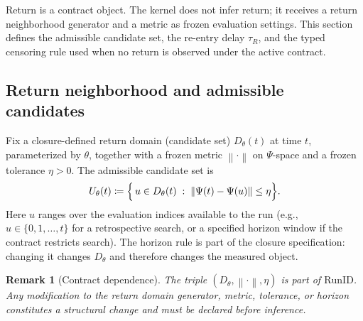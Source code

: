 \documentclass[
  aps,
  prd,
  preprint,
  superscriptaddress,
  nofootinbib,
  floatfix
]{revtex4-2}
\newcommand{\norm}[1]{\left\lVert #1 \right\rVert}
\newtheorem{remark}{Remark}
\begin{document}
Return is a contract object. The kernel does not infer return; it receives a return neighborhood generator and a metric
as frozen evaluation settings. This section defines the admissible candidate set, the re-entry delay $\tau_R$, and the
typed censoring rule used when no return is observed under the active contract.

\subsection{Return neighborhood and admissible candidates}
Fix a closure-defined return domain (candidate set) $D_\theta(t)$ at time $t$, parameterized by $\theta$, together with a
frozen metric $\norm{\cdot}$ on $\Psi$-space and a frozen tolerance $\eta>0$.
The admissible candidate set is
\begin{equation}
  U_\theta(t) \coloneqq \Bigl\{\,u\in D_\theta(t)\;:\; \norm{\Psi(t)-\Psi(u)}\le \eta \Bigr\}.
\end{equation}
Here $u$ ranges over the evaluation indices available to the run (e.g., $u\in\{0,1,\dots,t\}$ for a retrospective search,
or a specified horizon window if the contract restricts search). The horizon rule is part of the closure specification:
changing it changes $D_\theta$ and therefore changes the measured object.

\begin{remark}[Contract dependence]
The triple $(D_\theta,\norm{\cdot},\eta)$ is part of $\mathrm{RunID}$. Any modification to the return domain generator,
metric, tolerance, or horizon constitutes a structural change and must be declared before inference.
\end{remark}
\end{document}
